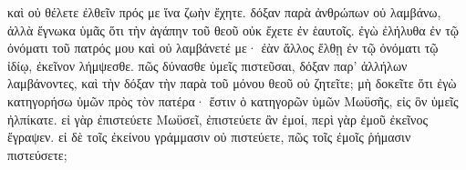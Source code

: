 \documentclass{openreader}
\begin{document}
καὶ οὐ θέλετε ἐλθεῖν πρός με ἵνα ζωὴν ἔχητε. 
δόξαν παρὰ ἀνθρώπων οὐ λαμβάνω, 
ἀλλὰ ἔγνωκα ὑμᾶς ὅτι τὴν ἀγάπην τοῦ θεοῦ οὐκ ἔχετε ἐν ἑαυτοῖς. 
ἐγὼ ἐλήλυθα ἐν τῷ ὀνόματι τοῦ πατρός μου καὶ οὐ λαμβάνετέ με· ἐὰν ἄλλος ἔλθῃ ἐν τῷ ὀνόματι τῷ ἰδίῳ, ἐκεῖνον λήμψεσθε. 
πῶς δύνασθε ὑμεῖς πιστεῦσαι, δόξαν παρ’ ἀλλήλων λαμβάνοντες, καὶ τὴν δόξαν τὴν παρὰ τοῦ μόνου θεοῦ οὐ ζητεῖτε; 
μὴ δοκεῖτε ὅτι ἐγὼ κατηγορήσω ὑμῶν πρὸς τὸν πατέρα· ἔστιν ὁ κατηγορῶν ὑμῶν Μωϋσῆς, εἰς ὃν ὑμεῖς ἠλπίκατε. 
εἰ γὰρ ἐπιστεύετε Μωϋσεῖ, ἐπιστεύετε ἂν ἐμοί, περὶ γὰρ ἐμοῦ ἐκεῖνος ἔγραψεν. 
εἰ δὲ τοῖς ἐκείνου γράμμασιν οὐ πιστεύετε, πῶς τοῖς ἐμοῖς ῥήμασιν πιστεύσετε; 
\end{document}
